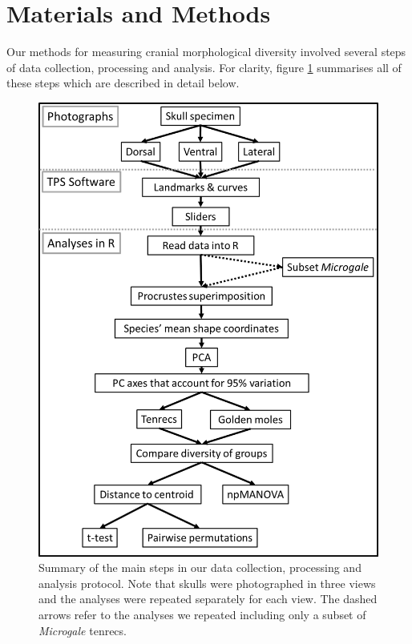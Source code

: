 \documentclass[12pt,a4paper]{article}
\begin{document}
\section{Materials and Methods}

	Our methods for measuring cranial morphological diversity involved several steps of data collection, processing and analysis. For clarity,  figure \ref{fig:flow} summarises all of these steps which are described in detail below.   
	
		\begin{figure}
		\centering
		\includegraphics[width=1\linewidth]{figures/Methods_flowchart.png}
		
		\caption[Flowchart diagram of data collection and analysis]
			{Summary of the main steps in our data collection, processing and analysis protocol. Note that skulls were photographed in three views and the analyses were repeated separately for each view. The dashed arrows refer to the analyses we repeated including only a subset of \textit{Microgale} tenrecs.}
		
		\label{fig:flow}
		\end{figure}
	
\end{document}
